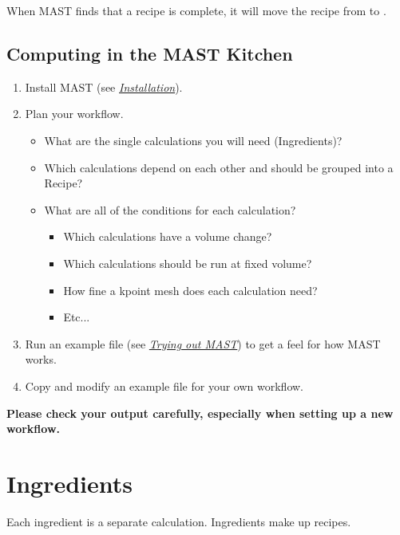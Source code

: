 \documentclass[letterpaper,10pt,english]{sphinxmanual}
\begin{document}
When MAST finds that a recipe is complete, it will move the recipe from  to .


\section{Computing in the MAST Kitchen}
\label{0_0_introduction:computing-in-the-mast-kitchen}\begin{enumerate}
\item {} 
Install MAST (see {\hyperref[1_0_installation::doc]{\emph{Installation}}}).

\item {} 
Plan your workflow.
\begin{itemize}
\item {} 
What are the single calculations you will need (Ingredients)?

\item {} 
Which calculations depend on each other and should be grouped into a Recipe?

\item {} 
What are all of the conditions for each calculation?
\begin{itemize}
\item {} 
Which calculations have a volume change?

\item {} 
Which calculations should be run at fixed volume?

\item {} 
How fine a kpoint mesh does each calculation need?

\item {} 
Etc...

\end{itemize}

\end{itemize}

\item {} 
Run an example file (see {\hyperref[17_0_testmast::doc]{\emph{Trying out MAST}}}) to get a feel for how MAST works.

\item {} 
Copy and modify an example file for your own workflow.

\end{enumerate}

\textbf{Please check your output carefully, especially when setting up a new workflow.}


\chapter{Ingredients}
\label{2_0_ingredients::doc}\label{2_0_ingredients:ingredients}
Each ingredient is a separate calculation. Ingredients make up recipes.
\end{document}
